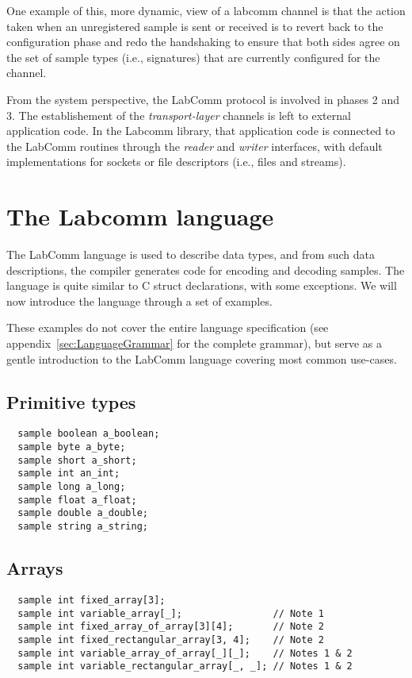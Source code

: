 \documentclass[a4paper]{article}
\begin{document}
One example of this, more dynamic, view of a labcomm channel is that the
action taken when an unregistered sample is sent or received is to
revert back to the configuration phase and redo the handshaking to
ensure that both sides agree on the set of sample types (i.e.,
signatures) that are currently configured for the channel.

From the system perspective, the LabComm protocol is involved in
phases 2 and 3. The establishement of the \emph{transport-layer}
channels is left to external application code. In the Labcomm library,
that application code is connected to the LabComm routines through
the \emph{reader} and \emph{writer} interfaces,
with default implementations for sockets or file descriptors (i.e.,
files and streams).


\section{The Labcomm language}

The LabComm language is used to describe data types, and from such data
descriptions, the compiler generates code for encoding and decoding
samples. The language is quite similar to C struct declarations, with
some exceptions. We will now introduce the language through a set of
examples.

These examples do not cover the entire language
specification (see appendix~\ref{sec:LanguageGrammar} for the complete
grammar), but serve as a gentle introduction to the LabComm
language covering most common use-cases.

\subsection{Primitive types}

\begin{verbatim}
  sample boolean a_boolean;
  sample byte a_byte;
  sample short a_short;
  sample int an_int;
  sample long a_long;
  sample float a_float;
  sample double a_double;
  sample string a_string;
\end{verbatim}

\subsection{Arrays}

\begin{verbatim}
  sample int fixed_array[3];
  sample int variable_array[_];                // Note 1
  sample int fixed_array_of_array[3][4];       // Note 2
  sample int fixed_rectangular_array[3, 4];    // Note 2
  sample int variable_array_of_array[_][_];    // Notes 1 & 2
  sample int variable_rectangular_array[_, _]; // Notes 1 & 2
\end{verbatim}
\end{document}
